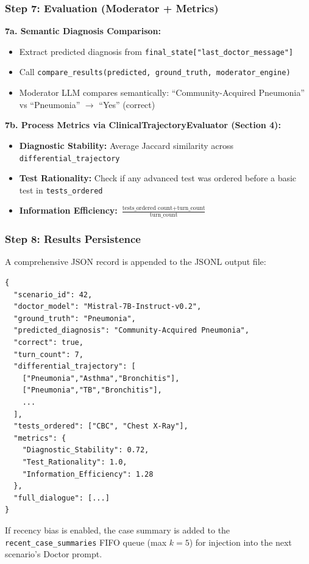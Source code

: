 \subsubsection{Step 7: Evaluation (Moderator + Metrics)}

\begin{acadbox}[\textcolor{white}{What Happens}]
\textbf{7a. Semantic Diagnosis Comparison:}
\begin{itemize}
    \item Extract predicted diagnosis from \texttt{final\_state["last\_doctor\_message"]}
    \item Call \texttt{compare\_results(predicted, ground\_truth, moderator\_engine)}
    \item Moderator LLM compares semantically: ``Community-Acquired Pneumonia'' vs ``Pneumonia'' $\rightarrow$ ``Yes'' (correct)
\end{itemize}

\textbf{7b. Process Metrics via ClinicalTrajectoryEvaluator (Section 4):}
\begin{itemize}
    \item \textbf{Diagnostic Stability:} Average Jaccard similarity across \texttt{differential\_trajectory}
    \item \textbf{Test Rationality:} Check if any advanced test was ordered before a basic test in \texttt{tests\_ordered}
    \item \textbf{Information Efficiency:} $\frac{\text{tests\_ordered count} + \text{turn\_count}}{\text{turn\_count}}$
\end{itemize}
\end{acadbox}

\subsubsection{Step 8: Results Persistence}

\begin{acadbox}[\textcolor{white}{What Happens}]
A comprehensive JSON record is appended to the JSONL output file:
\begin{verbatim}
{
  "scenario_id": 42,
  "doctor_model": "Mistral-7B-Instruct-v0.2",
  "ground_truth": "Pneumonia", 
  "predicted_diagnosis": "Community-Acquired Pneumonia",
  "correct": true,
  "turn_count": 7,
  "differential_trajectory": [
    ["Pneumonia","Asthma","Bronchitis"],
    ["Pneumonia","TB","Bronchitis"],
    ...
  ],
  "tests_ordered": ["CBC", "Chest X-Ray"],
  "metrics": {
    "Diagnostic_Stability": 0.72,
    "Test_Rationality": 1.0,
    "Information_Efficiency": 1.28
  },
  "full_dialogue": [...]
}
\end{verbatim}

If recency bias is enabled, the case summary is added to the \texttt{recent\_case\_summaries} FIFO queue (max $k=5$) for injection into the next scenario's Doctor prompt.
\end{acadbox}

